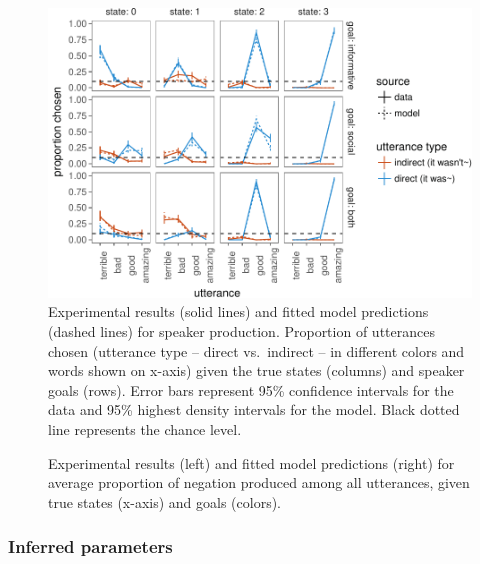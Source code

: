 \documentclass[12pt]{article}
\begin{document}
\begin{figure}
\centering
\includegraphics{fig/utterancePrediction-1.pdf}
\caption{\label{fig:utterancePrediction}Experimental results (solid lines) and fitted model predictions (dashed lines) for speaker production.
Proportion of utterances chosen (utterance type -- direct vs.~indirect -- in different colors and words shown on x-axis) given the true states (columns) and speaker goals (rows). Error bars represent 95\% confidence intervals for the data and 95\% highest density intervals for the model.
Black dotted line represents the chance level.}
\end{figure}

\begin{figure}
\centering
\caption{\label{fig:negationPrediction}Experimental results (left) and fitted model predictions (right) for average proportion of negation produced among all utterances, given true states (x-axis) and goals (colors).}
\end{figure}


\subsubsection*{Inferred parameters}
\end{document}

